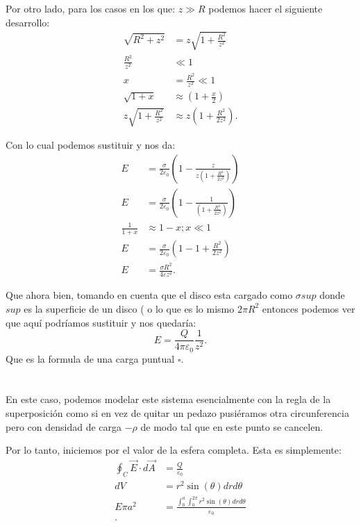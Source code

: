 \documentclass{report}
\begin{document}
Por otro lado, para los casos en los que: $z \gg R$ podemos hacer el siguiente desarrollo:
\begin{align*}
  \sqrt{R^2 + z^2} &= z\sqrt{1 + \frac{R^2}{z^2}}  \\
  \frac{R^2}{z^2} &\ll 1\\
  x &= \frac{R^2}{z^2} \ll 1 \\
  \sqrt{1 + x} &\approx \left( 1 + \frac{x}{2} \right) \\
  z\sqrt{1 + \frac{R^2}{z^2}} &\approx z\left( 1 + \frac{R^2}{2z^2} \right) 
.\end{align*}

Con lo cual podemos sustituir y nos da:
\begin{align*}
  E &= \frac{\sigma}{2\varepsilon_0} \left( 1 - \frac{z}{z\left( 1 + \frac{R^2}{2z^2} \right) } \right) \\
  E &= \frac{\sigma}{2\varepsilon_0} \left( 1 - \frac{1}{\left( 1 + \frac{R^2}{2z^2} \right) } \right) \\
  \frac{1}{1 + x} &\approx 1 - x; x \ll 1\\
  E &= \frac{\sigma}{2\varepsilon_0}\left( 1 - 1 + \frac{R^2}{2z^2} \right)  \\
  E &= \frac{\sigma R^2}{4\varepsilon z^2}
.\end{align*}

Que ahora bien, tomando en cuenta que el disco esta cargado como $\sigma sup$ donde  $sup$ es la superficie de un disco ( o lo que es lo mismo $2\pi R^2$ entonces podemos ver que aquí podríamos sustituir y nos quedaría: \[
E = \frac{Q}{4\pi\varepsilon_0} \frac{1}{z^2}
.\]  Que es la formula de una carga puntual $\square$.

\chapter{}

En este caso, podemos modelar este sistema esencialmente con la regla de la superposición como si en vez de quitar un pedazo pusiéramos otra circunferencia pero con densidad de carga $-\rho$ de modo tal que en este punto se cancelen.

Por lo tanto, iniciemos por el valor de la esfera completa. Esta es simplemente:
\begin{align*}
  \oint_{C} \vec{E} \cdot d\vec{A} &= \frac{Q}{\varepsilon_0} \\
  dV &= r^2 \sin\left( \theta \right) dr d\theta \\
  E \pi a^2 &= \frac{\int_{0}^{a} \int_{0}^{2\pi} r^2 \sin\left( \theta \right) dr d\theta }{\varepsilon_0} \\
.\end{align*}
\end{document}

